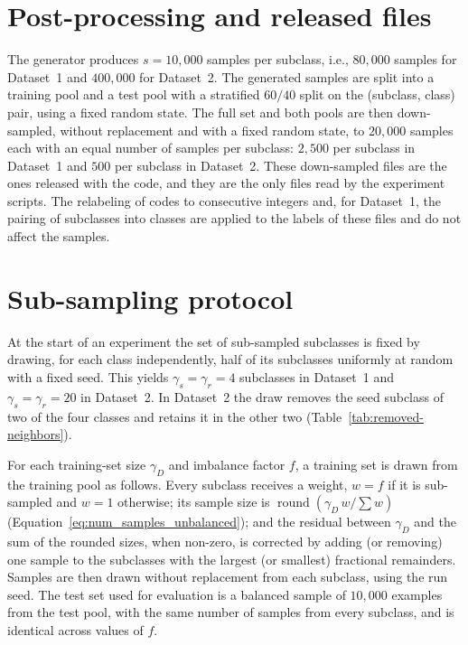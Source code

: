 \documentclass[../ppgc-tese.tex]{subfiles}
\begin{document}
\section{Post-processing and released files}\label{app:postprocessing}

The generator produces $s = 10{,}000$ samples per subclass, i.e., $80{,}000$ samples for Dataset~1 and $400{,}000$ for Dataset~2. The generated samples are split into a training pool and a test pool with a stratified $60/40$ split on the (subclass, class) pair, using a fixed random state. The full set and both pools are then down-sampled, without replacement and with a fixed random state, to $20{,}000$ samples each with an equal number of samples per subclass: $2{,}500$ per subclass in Dataset~1 and $500$ per subclass in Dataset~2. These down-sampled files are the ones released with the code, and they are the only files read by the experiment scripts. The relabeling of codes to consecutive integers and, for Dataset~1, the pairing of subclasses into classes are applied to the labels of these files and do not affect the samples.

\section{Sub-sampling protocol}\label{app:subsampling}

At the start of an experiment the set of sub-sampled subclasses is fixed by drawing, for each class independently, half of its subclasses uniformly at random with a fixed seed. This yields $\gamma_s = \gamma_r = 4$ subclasses in Dataset~1 and $\gamma_s = \gamma_r = 20$ in Dataset~2. In Dataset~2 the draw removes the seed subclass of two of the four classes and retains it in the other two (Table~\ref{tab:removed-neighbors}).

For each training-set size $\gamma_D$ and imbalance factor $f$, a training set is drawn from the training pool as follows. Every subclass receives a weight, $w = f$ if it is sub-sampled and $w = 1$ otherwise; its sample size is $\operatorname{round}(\gamma_D\, w / \sum w)$ (Equation~\ref{eq:num_samples_unbalanced}); and the residual between $\gamma_D$ and the sum of the rounded sizes, when non-zero, is corrected by adding (or removing) one sample to the subclasses with the largest (or smallest) fractional remainders. Samples are then drawn without replacement from each subclass, using the run seed. The test set used for evaluation is a balanced sample of $10{,}000$ examples from the test pool, with the same number of samples from every subclass, and is identical across values of $f$.
\end{document}
